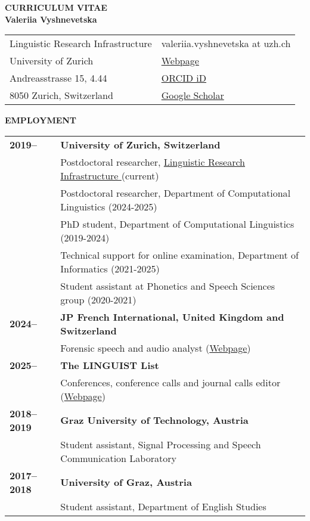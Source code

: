 \documentclass[11pt]{article}
\begin{document}
\begin{center}
{\bf CURRICULUM VITAE\\Valeriia Vyshnevetska}\\
\vskip 12pt






\begin{tabular}{ll}
Linguistic Research Infrastructure & valeriia.vyshnevetska at uzh.ch \\
University of Zurich & \href{https://www.liri.uzh.ch/en/aboutus/Valeriia-Perepelytsia.html}{Webpage} \\ 
Andreasstrasse 15, 4.44 & \href{https://orcid.org/0009-0003-3355-9580}{ORCID iD} \\
8050 Zurich, Switzerland & \href{https://scholar.google.com/citations?user=9IiY_w8AAAAJ&hl=ru}{Google Scholar} \\
\end{tabular}
\end{center}





\vskip 12pt
\begin{flushleft}
{\bf EMPLOYMENT}
\end{flushleft}
\begin{tabular}{lp{5.5in}}
\bf 2019-- & {\bf University of Zurich, Switzerland} \\
& Postdoctoral researcher, \href{https://www.liri.uzh.ch/}{Linguistic Research Infrastructure }(current) \\

& Postdoctoral researcher, Department of Computational Linguistics (2024-2025) \\
& PhD student, Department of Computational Linguistics (2019-2024) \\
& Technical support for online examination, Department of Informatics (2021-2025) \\
& Student assistant at Phonetics and Speech Sciences group (2020-2021) \\
\bf 2024-- & {\bf JP French International, United Kingdom and Switzerland} \\
& Forensic speech and audio analyst (\href{https://www.jpfrench.com/valeriia-vyshnevetska/}{Webpage}) \\
\bf 2025-- & {\bf The LINGUIST List} \\
& Conferences, conference calls and journal calls editor (\href{https://linguistlist.org/}{Webpage}) \\
\bf 2018--2019 & {\bf Graz University of Technology, Austria} \\
& Student assistant, Signal Processing and Speech Communication Laboratory \\
\bf 2017--2018 & {\bf University of Graz, Austria} \\
& Student assistant, Department of English Studies \\
\end{tabular}
\end{document}
